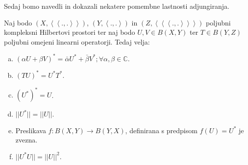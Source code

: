 \documentclass[mat2]{matdelo}
\newcommand{\C}{\mathbb{C}}
\newcommand{\abs}[1]{\ensuremath{\lvert #1 \rvert}}
\newcommand{\norm}[1]{\abs{\abs{#1}}}
\newcommand{\Sp}[2]{\ensuremath{\left<#1, #2\right>}}
\newcommand{\Spp}[2]{\ensuremath{\left<\left<#1, #2\right>\right>}}
\newcommand{\Sppp}[2]{\ensuremath{\left<\left<\left<#1, #2\right>\right>\right>}}
\newcommand{\map}[3]{\ensuremath{{#1}:{#2}\rightarrow{#3}}}
\begin{document}
			Sedaj bomo navedli in dokazali nekatere pomembne lastnosti adjungiranja.
			
			\begin{izrek}
				\label{izr:adjlast}
				Naj bodo $(X, \Spp{.}{.})$, $(Y, \Sp{.}{.})$ in $(Z, \Sppp{.}{.})$ poljubni kompleksni Hilbertovi prostori ter naj bodo $U, V \in B(X, Y)$ ter $T \in B(Y, Z)$ poljubni omejeni linearni operatorji. Tedaj velja: \begin{enumerate}[a)]
					\item $(\alpha U + \beta V)^* = \bar{\alpha}U^* + \bar{\beta}V^*; \forall \alpha, \beta \in \C$.
					\item $(TU)^* = U^*T^*$.
					\item $(U^*)^* = U$.
					\item $\norm{U^*} = \norm{U}$.
					\item Preslikava $\map{f}{B(X, Y)}{B(Y, X)}$, definirana s predpisom $f(U) = U^*$ je zvezna.
					\item $\norm{U^*U} = \norm{U}^2$.
				\end{enumerate}
			\end{izrek}
			
\end{document}
